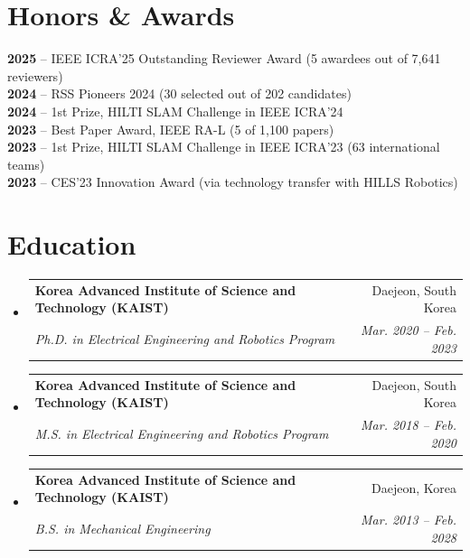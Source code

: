 \documentclass[letterpaper,10pt]{article}
\makeatletter
\newcommand{\resumeSubheading}[4]{
  \vspace{-3pt}\item
    \begin{tabular*}{0.97\textwidth}[t]{l@{\extracolsep{\fill}}r}
      \textbf{#1} & #2 \\
      \textit{\small#3} & \textit{\small #4} \\
    \end{tabular*}\vspace{-9pt}
}
\newcommand{\resumeSubHeadingListStart}{\begin{itemize}[leftmargin=0.15in, label={}]}
\newcommand{\resumeSubHeadingListEnd}{\end{itemize}}
\makeatother
\begin{document}
\section{Honors \& Awards}
 \begin{itemize}[leftmargin=0.15in, label={}]
    \small{\item{
     \textbf{2025} -- IEEE ICRA'25 Outstanding Reviewer Award (5 awardees out of 7,641 reviewers) \\
     \textbf{2024} -- RSS Pioneers 2024 (30 selected out of 202 candidates) \\
     \textbf{2024} -- 1st Prize, HILTI SLAM Challenge in IEEE ICRA'24 \\
     \textbf{2023} -- Best Paper Award, IEEE RA-L (5 of 1,100 papers) \\
     \textbf{2023} -- 1st Prize, HILTI SLAM Challenge in IEEE ICRA'23 (63 international teams) \\
     \textbf{2023} -- CES'23 Innovation Award (via technology transfer with HILLS Robotics)
    }}
 \end{itemize}


\section{Education}
  \resumeSubHeadingListStart
    \resumeSubheading
      {Korea Advanced Institute of Science and Technology (KAIST)}{Daejeon, South Korea}
      {Ph.D. in Electrical Engineering and Robotics Program}{Mar. 2020 -- Feb. 2023}
    \resumeSubheading
      {Korea Advanced Institute of Science and Technology (KAIST)}{Daejeon, South Korea}
      {M.S. in Electrical Engineering and Robotics Program}{Mar. 2018 -- Feb. 2020}
    \resumeSubheading
      {Korea Advanced Institute of Science and Technology (KAIST)}{Daejeon, Korea}
      {B.S. in Mechanical Engineering}{Mar. 2013 -- Feb. 2028}

  \resumeSubHeadingListEnd


\end{document}
